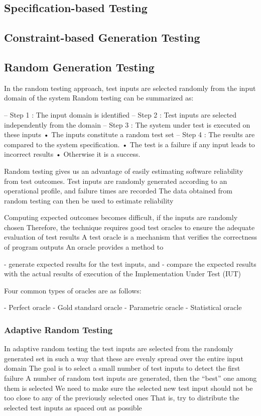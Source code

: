 \documentclass[citeauthoryear]{llncs}
\begin{document}
\subsection{Specification-based Testing}

\subsection{Constraint-based Generation Testing}

\subsection{Random Generation Testing}
In the random testing approach, test inputs are selected randomly from the input domain of the system
Random testing can be summarized as:

– Step 1 : The input domain is identified
– Step 2 : Test inputs are selected independently from the domain
– Step 3 : The system under test is executed on these inputs
• The inputs constitute a random test set
– Step 4 : The results are compared to the system specification.
• The test is a failure if any input leads to incorrect results
• Otherwise it is a success.

Random testing gives us an advantage of easily estimating software reliability from test outcomes.
Test inputs are randomly generated according to an operational
profile, and failure times are recorded The data obtained from random testing can then be used to estimate reliability

Computing expected outcomes becomes difficult, if the inputs are randomly chosen
Therefore, the technique requires good test oracles to ensure the adequate evaluation of test results
A test oracle is a mechanism that verifies the correctness of program outputs
An oracle provides a method to

- generate expected results for the test inputs, and
- compare the expected results with the actual results of execution of the Implementation Under Test (IUT)

Four common types of oracles are as follows:

- Perfect oracle
- Gold standard oracle
- Parametric oracle
- Statistical oracle

\subsubsection{Adaptive Random Testing}
In adaptive random testing the test inputs are selected from the
randomly generated set in such a way that these are evenly spread
over the entire input domain
The goal is to select a small number of test inputs to detect the first
failure
A number of random test inputs are generated, then the “best” one
among them is selected
We need to make sure the selected new test input should not be too
close to any of the previously selected ones
That is, try to distribute the selected test inputs as spaced out as
possible
\end{document}
